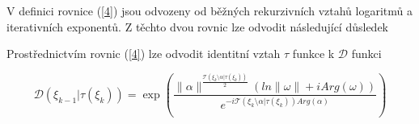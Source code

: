 V definici rovnice (\ref{4}) jsou odvozeny od běžných 
rekurzivních vztahů logaritmů a iterativních exponentů.
Z těchto dvou rovnic lze odvodit následující důsledek

\begin{corollary}
      Prostřednictvím rovnic (\ref{4}) lze odvodit
      identitní vztah \(\tau\) funkce k \(\mathcal{D}\) funkci
      
      \begin{equation}\label{R:int}
            \mathcal{D}(\xi_{k-1} | \tau(\xi_k)) =
            \exp\left(\frac{\|\alpha\|^{\frac{\mathcal{T}(\xi_k
                  \setminus \alpha | \tau(\xi_k))}{2}}(ln\|\omega\| +
            i Arg(\omega))}{e^{-i\mathcal{T}(\xi_k \setminus \alpha
            | \tau(\xi_k))Arg(\alpha)} }\right)
      \end{equation}
\end{corollary}
